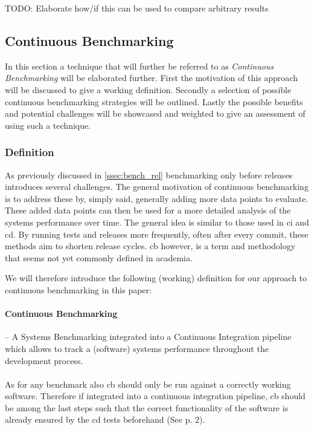 \documentclass[	runningheads,
				a4paper]{llncs}
\begin{document}
TODO: Elaborate how/if this can be used to compare arbitrary results

	\subsection{Continuous Benchmarking}
In this section a technique that will further be referred to as \textit{Continuous Benchmarking} will be elaborated further. First the motivation of this approach will be discussed to give a working definition. Secondly a selection of possible continuous benchmarking strategies will be outlined. Lastly the possible benefits and potential challenges will be showcased and weighted to give an assessment of using such a technique.

	\subsubsection{Definition}
	As previously discussed in \autoref{ssec:bench_rel} benchmarking only before releases introduces several challenges. The general motivation of continuous benchmarking is to address these by, simply said, generally adding more data points to evaluate. These added data points can then be used for a more detailed analysis of the systems performance over time. The general idea is similar to those used in \gls{ci} and \gls{cd}. By running tests and releases more frequently, often after every commit, these methods aim to shorten release cycles. \gls{cb} however, is a term and methodology that seems not yet commonly defined in academia.

	We will therefore introduce the following (working) definition for our approach to continuous benchmarking in this paper:
	\paragraph{Continuous Benchmarking} -- A Systems Benchmarking integrated into a Continuous Integration pipeline which allows to track a (software) systems performance throughout the development process.

	\paragraph{}As for any benchmark also \gls{cb} should only be run against a correctly working software. Therefore if integrated into a continuous integration pipeline, \gls{cb} should be among the last steps such that the correct functionality of the software is already ensured by the \gls{cd} tests beforehand (See \cite{grambow2019} p. 2).
\end{document}
